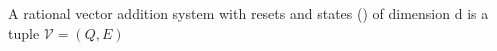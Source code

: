 
\begin{mydef}
A rational vector addition system with resets and states (\qvasrs) of dimension d is a tuple $\mathcal{V} = (Q, E)$
\end{mydef}

